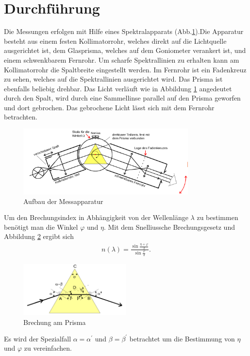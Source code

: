 \section{Durchführung}
Die Messungen erfolgen mit Hilfe eines Spektralapparats (Abb.\ref{pic_aufbau}).Die Apparatur besteht aus einem festen Kollimatorrohr, 
welches direkt auf die Lichtquelle ausgerichtet ist, dem Glasprisma, welches auf dem Goniometer verankert ist, und einem schwenkbarem 
Fernrohr. Um scharfe Spektrallinien zu erhalten kann am Kollimatorrohr die Spaltbreite eingestellt werden. Im Fernrohr ist ein 
Fadenkreuz zu sehen, welches auf die Spektrallinien ausgerichtet wird. Das Prisma ist ebenfalls beliebig drehbar. Das Licht verläuft wie 
in Abbildung \ref{pic_aufbau} angedeutet durch den Spalt, wird durch eine Sammellinse parallel auf den Prisma geworfen und dort gebrochen. 
Das gebrochene Licht lässt sich mit dem Fernrohr betrachten.
\begin{figure}[H]
\includegraphics[width=0.8\textwidth]{pics/spek_app.png}
\caption{Aufbau der Messapparatur}
\label{pic_aufbau}
\end{figure}
Um den Brechungsindex in Abhängigkeit von der Wellenlänge $\lambda$ zu bestimmen benötigt man die Winkel $\varphi$ und $\eta$. 
Mit dem Snelliussche Brechungsgesetz und Abbildung \ref{pic_brechung} ergibt sich
\begin{align}
n(\lambda)=\frac{\sin\frac{\eta +\varphi}{2}}{\sin\frac{\varphi}{2}}.
\label{eq_brechung}
\end{align}
\begin{figure}[H]
\includegraphics[width=0.5\textwidth]{pics/prisma_sym.png}
\caption{Brechung am Prisma}
\label{pic_brechung}
\end{figure}
Es wird der Spezialfall $\alpha=\alpha^{\prime}$ und $\beta = \beta^{\prime}$ betrachtet um die Bestimmung von $\eta$ und $\varphi$ zu 
vereinfachen.

